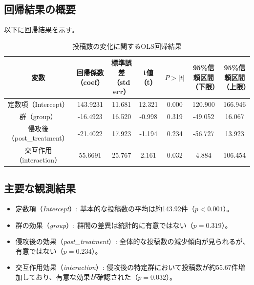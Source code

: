 \documentclass[11pt, a4j]{jreport}
\begin{document}
    \subsection*{回帰結果の概要}
    以下に回帰結果を示す。

    \begin{table}[H]
        \centering
        \begin{tabular}{|c|c|c|c|c|c|c|}
            \hline
            変数 & 回帰係数（coef） & 標準誤差（std err） & t値（t） & $P>|t|$ & 95\%信頼区間（下限） & 95\%信頼区間（上限） \\
            \hline
            定数項（Intercept） & 143.9231 & 11.681 & 12.321 & 0.000 & 120.900 & 166.946 \\
            群（group） & -16.4923 & 16.520 & -0.998 & 0.319 & -49.052 & 16.067 \\
            侵攻後（post\_treatment） & -21.4022 & 17.923 & -1.194 & 0.234 & -56.727 & 13.923 \\
            交互作用（interaction） & 55.6691 & 25.767 & 2.161 & 0.032 & 4.884 & 106.454 \\
            \hline
        \end{tabular}
        \caption{投稿数の変化に関するOLS回帰結果}
        \label{tab:ols_results}
    \end{table}

    \subsection*{主要な観測結果}
    \begin{itemize}
        \item 定数項（\textit{Intercept}）: 基本的な投稿数の平均は約143.92件（$p < 0.001$）。
        \item 群の効果（\textit{group}）: 群間の差異は統計的に有意ではない（$p = 0.319$）。
        \item 侵攻後の効果（\textit{post\_treatment}）: 全体的な投稿数の減少傾向が見られるが、有意ではない（$p = 0.234$）。
        \item 交互作用効果（\textit{interaction}）: 侵攻後の特定群において投稿数が約55.67件増加しており、有意な効果が確認された（$p = 0.032$）。
    \end{itemize}
\end{document}
